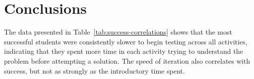%	
%	


	
\section{Conclusions }

The data presented in Table~\ref{tab:success-correlations} shows that the most successful students were consistently slower to begin testing across all activities, indicating that they spent more time in each activity trying to understand the problem before attempting a solution. The speed of iteration also correlates with success, but not as strongly as the introductory time spent.

